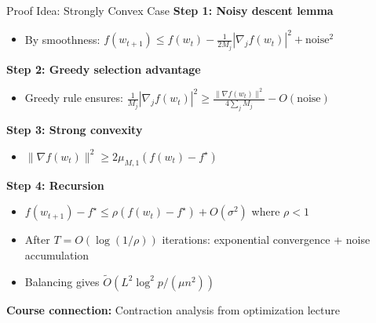 \documentclass[10pt]{beamer}
\begin{document}
\begin{frame}{Proof Idea: Strongly Convex Case}
\textbf{Step 1: Noisy descent lemma}
\begin{itemize}
\item By smoothness: $f(w_{t+1}) \leq f(w_t) - \frac{1}{2M_j}|\nabla_j f(w_t)|^2 + \text{noise}^2$
\end{itemize}

\vspace{0.5em}
\textbf{Step 2: Greedy selection advantage}
\begin{itemize}
\item Greedy rule ensures: $\frac{1}{M_j}|\nabla_j f(w_t)|^2 \geq \frac{\|\nabla f(w_t)\|^2}{4\sum_j M_j} - O(\text{noise})$
\end{itemize}

\vspace{0.5em}
\textbf{Step 3: Strong convexity}
\begin{itemize}
\item $\|\nabla f(w_t)\|^2 \geq 2\mu_{M,1}(f(w_t) - f^\star)$
\end{itemize}

\vspace{0.5em}
\textbf{Step 4: Recursion}
\begin{itemize}
\item $f(w_{t+1}) - f^\star \leq \rho (f(w_t) - f^\star) + O(\sigma^2)$ where $\rho < 1$
\item After $T = O(\log(1/\rho))$ iterations: exponential convergence + noise accumulation
\item Balancing gives $\tilde{O}(L^2 \log^2 p / (\mu n^2))$
\end{itemize}

\vspace{0.3em}
\textbf{Course connection:} Contraction analysis from optimization lecture
\end{frame}
\end{document}
